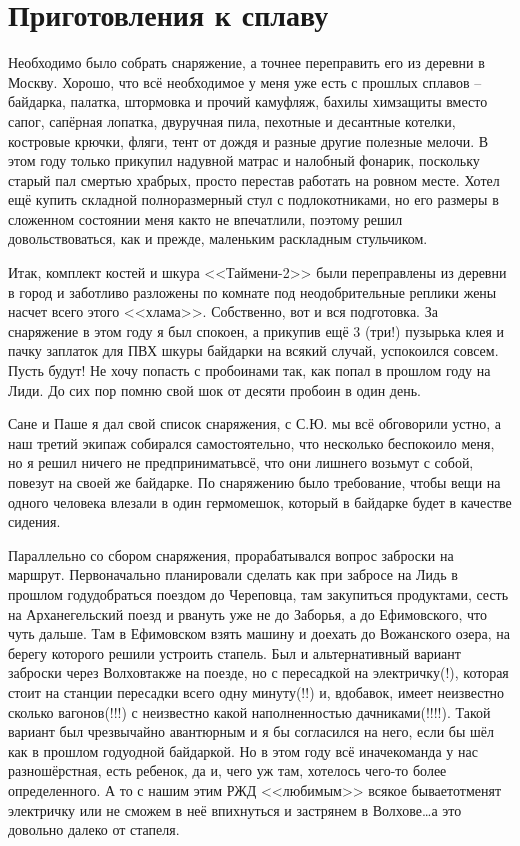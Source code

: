 \chapter{Приготовления к сплаву} 

Необходимо было собрать снаряжение, а точнее переправить его из деревни в Москву. Хорошо, что всё необходимое у меня уже есть с прошлых сплавов – байдарка, палатка, штормовка и прочий камуфляж, бахилы химзащиты вместо сапог, сапёрная лопатка, двуручная пила, пехотные и десантные котелки, костровые крючки, фляги, тент от дождя и разные другие полезные мелочи. В этом году только прикупил надувной матрас и налобный фонарик, поскольку старый пал смертью храбрых, просто перестав работать на ровном месте. Хотел ещё купить складной полноразмерный стул с подлокотниками, но его размеры в сложенном состоянии меня как\sdash то не впечатлили, поэтому решил довольствоваться, как и прежде, маленьким раскладным стульчиком.

Итак, комплект костей и шкура <<Таймени-2>> были переправлены из деревни в город и заботливо разложены по комнате под неодобрительные реплики жены насчет всего этого <<хлама>>. Собственно, вот и вся подготовка. За снаряжение в этом году я был спокоен, а прикупив ещё 3 (три!) пузырька клея и пачку заплаток для ПВХ шкуры байдарки на всякий случай, успокоился совсем. Пусть будут! Не хочу попасть с пробоинами так, как попал в прошлом году на Лиди. До сих пор помню свой шок от десяти пробоин в один день.

Сане и Паше я дал свой список снаряжения, с С.Ю. мы всё обговорили устно, а наш третий экипаж собирался самостоятельно, что несколько беспокоило меня, но я решил ничего не предпринимать\mdash всё, что они лишнего возьмут с собой, повезут на своей же байдарке. По снаряжению было требование, чтобы вещи на одного человека влезали в один гермомешок, который в байдарке будет в качестве сидения.

Параллельно со сбором снаряжения, прорабатывался вопрос заброски на маршрут. Первоначально планировали сделать как при забросе на Лидь в прошлом году\mdash добраться поездом до Череповца, там закупиться продуктами, сесть на Арханегельский поезд и рвануть уже не до Заборья, а до Ефимовского, что чуть дальше. Там в Ефимовском взять машину и доехать до Вожанского озера, на берегу которого решили устроить стапель. Был и альтернативный вариант заброски через Волхов\mdash также на поезде, но с пересадкой на электричку(!), которая стоит на станции пересадки всего одну минуту(!!) и, вдобавок, имеет неизвестно сколько вагонов(!!!) с неизвестно какой наполненностью дачниками(!!!!). Такой вариант был чрезвычайно авантюрным и я бы согласился на него, если бы шёл как в прошлом году\mdash одной байдаркой. Но в этом году всё иначе\mdash команда у нас разношёрстная, есть ребенок, да и, чего уж там, хотелось чего-то более определенного. А то с нашим этим РЖД <<любимым>> всякое бывает\mdash отменят электричку или не сможем в неё впихнуться и застрянем в Волхове\ldots а это довольно далеко от стапеля.
 
